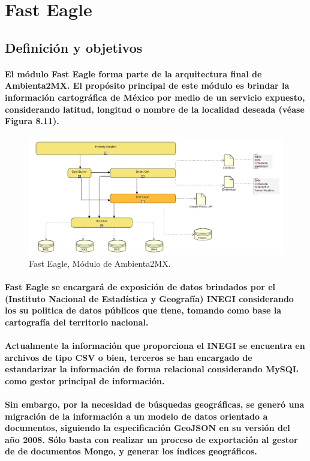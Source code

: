 \section{Fast Eagle}
  \subsection{Definición y objetivos}
    \paragraph{El módulo Fast Eagle forma parte de la arquitectura final de Ambienta2MX. El propósito principal de este módulo es brindar la información cartográfica de México por medio de un servicio expuesto, considerando latitud, longitud o nombre de la localidad deseada (véase Figura 8.11).}
    \begin{figure}[h!]
        \centering
          \includegraphics[width=\textwidth]{./images/DiagramaAmbienta2MX_FastEagle.png}
        \caption{Fast Eagle, Módulo de Ambienta2MX.}
    \end{figure}
    \paragraph{Fast Eagle se encargará de exposición de datos brindados por el (Instituto Nacional de Estadística y Geografía) INEGI considerando los su politica de datos públicos que tiene, tomando como base la cartografía del territorio nacional.}
    \paragraph{Actualmente la información que proporciona el INEGI se encuentra en archivos de tipo CSV o bien, terceros se han encargado de estandarizar la información de forma relacional considerando MySQL como gestor principal de información.}
    \paragraph{Sin embargo, por la necesidad de búsquedas geográficas, se generó una migración de la información a un modelo de datos orientado a documentos, siguiendo la especificación GeoJSON en su versión del año 2008. Sólo basta con realizar un proceso de exportación al gestor de de documentos Mongo, y generar los índices geográficos. \cite{35}}
